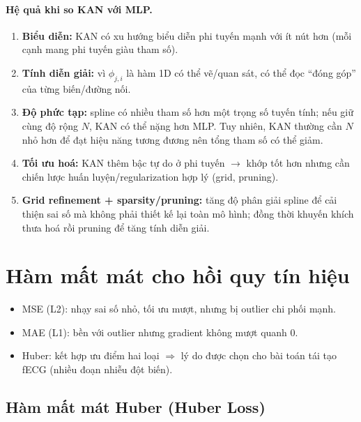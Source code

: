 \documentclass[../DoAn.tex]{subfiles}
\begin{document}
\paragraph{Hệ quả khi so KAN với MLP.}
\begin{enumerate}
  \item \textbf{Biểu diễn:} KAN có xu hướng biểu diễn phi tuyến mạnh với ít nút hơn (mỗi cạnh mang phi tuyến giàu tham số).
  \item \textbf{Tính diễn giải:} vì $\phi_{j,i}$ là hàm 1D có thể vẽ/quan sát, có thể đọc ``đóng góp'' của từng biến/đường nối.
  \item \textbf{Độ phức tạp:} spline có nhiều tham số hơn một trọng số tuyến tính; nếu giữ cùng độ rộng $N$, KAN có thể nặng hơn MLP.
    Tuy nhiên, KAN thường cần $N$ nhỏ hơn để đạt hiệu năng tương đương nên tổng tham số có thể giảm.
  \item \textbf{Tối ưu hoá:} KAN thêm bậc tự do ở phi tuyến $\rightarrow$ khớp tốt hơn nhưng cần chiến lược huấn luyện/regularization hợp lý (grid, pruning).
  \item \textbf{Grid refinement + sparsity/pruning:} tăng độ phân giải spline để cải thiện sai số mà không phải thiết kế lại toàn mô hình; đồng thời khuyến khích thưa hoá rồi pruning để tăng tính diễn giải.
\end{enumerate}

\section{Hàm mất mát cho hồi quy tín hiệu}

\begin{itemize}
  \item MSE (L2): nhạy sai số nhỏ, tối ưu mượt, nhưng bị outlier chi phối mạnh.
  \item MAE (L1): bền với outlier nhưng gradient không mượt quanh 0.
  \item Huber: kết hợp ưu điểm hai loại $\Rightarrow$ lý do được chọn cho bài toán tái tạo fECG (nhiều đoạn nhiễu đột biến).
\end{itemize}

\subsection{Hàm mất mát Huber (Huber Loss)}
\end{document}
